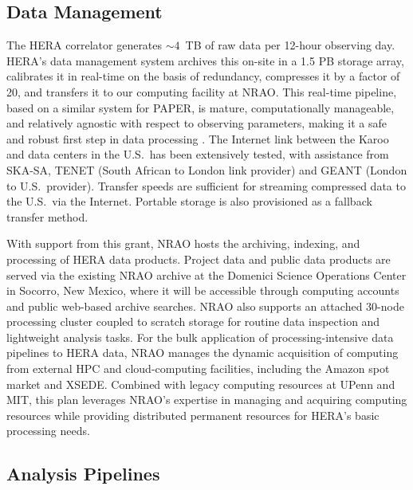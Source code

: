 \documentclass[preprint,11pt]{aastex}
\begin{document}
\subsection{Data Management}
\label{sec:data}
\noindent The HERA correlator generates $\sim4$~TB of raw data per 12-hour observing day.
HERA's data management system archives this on-site in a 1.5 PB storage array, calibrates it in real-time
on the basis of redundancy, compresses it by a factor of 20, and transfers it to our computing facility at NRAO.
This real-time pipeline, based on a similar system for PAPER, is mature, computationally manageable, and 
relatively agnostic with respect to observing parameters, making it a safe and robust first step in data processing
\citep{zheng_et_al2014,parsons_etal2014,ali_et_al2015}.
The Internet link between the Karoo and data centers in the U.S.\ has been extensively tested, with assistance from SKA-SA, TENET
(South African to London link provider) and GEANT (London to U.S.\ provider).   
Transfer speeds are sufficient for streaming compressed data to the U.S.\ via the Internet. Portable storage is also
provisioned as a fallback transfer method.

With support from this grant, NRAO hosts the archiving, indexing, and processing of HERA data products. 
Project data and public data products are served via the existing 
NRAO archive at the Domenici Science Operations Center %
in Socorro, New Mexico, where it will be accessible through computing accounts and public web-based
archive searches.
NRAO also supports
an attached 30-node processing cluster 
coupled to 
scratch storage
for routine data inspection and lightweight analysis tasks.
For the bulk application of processing-intensive data pipelines to HERA data,
NRAO manages the dynamic acquisition of computing from
external HPC and cloud-computing facilities, including the Amazon spot market and XSEDE. 
Combined with legacy computing resources at UPenn and MIT, this plan leverages NRAO's
expertise in managing and acquiring computing resources while providing distributed
permanent resources for HERA's basic processing needs.



\subsection{Analysis Pipelines} 
\label{sec:software}
\end{document}
